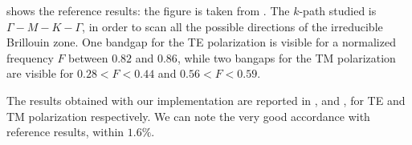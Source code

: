  shows the reference results: the figure is
taken from \cite{mpb}. The $k$-path studied is $\Gamma-M-K-\Gamma$, in
order to scan all the possible directions of the irreducible Brillouin
zone. One bandgap for the TE polarization is visible for a normalized
frequency $F$ between $0.82$ and $0.86$, while two bangaps for the TM
polarization are visible for $0.28 < F < 0.44$ and $0.56 < F < 0.59$.

The results obtained with our implementation are reported in
,  and , for TE and TM
polarization respectively. We can note the very good accordance with
reference results, within $1.6\%$.

\begin{table}[htbp]
  \begin{center}
  \end{center}
  \caption{TE and TM results. Note that the MPB results values have
    been extracted graphically from the available graph, so accuracy is
    not better that $0.01$. Overall accordance is within $1.6\%$.}
  \label{tab:test_1}
\end{table}

